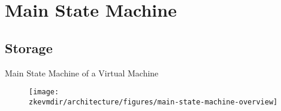 
\section{Main State Machine}

\subsection{Storage}


\begin{frame}{Main State Machine of a Virtual Machine}
\begin{figure}
	\texttt{[image: \\zkevmdir/architecture/figures/main-state-machine-overview]}
\end{figure}
\end{frame}







